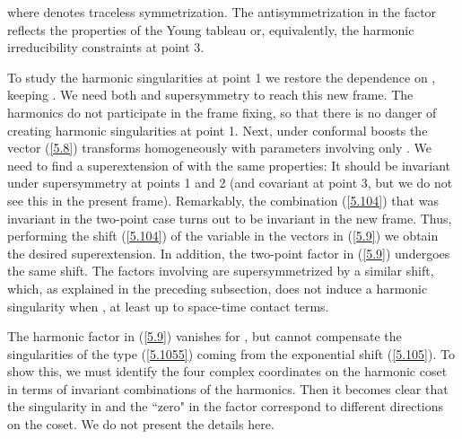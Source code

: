 \documentclass[a4paper,11pt]{article}
\begin{document}
where \coordHE{} denotes traceless symmetrization. The \coordHE{}
antisymmetrization in the factor \coordHE{} reflects the properties of
the \coordHE{} Young tableau \coordHE{} or, equivalently, the harmonic
irreducibility constraints at point 3.

To study the harmonic singularities at point 1 we restore the
dependence on \myHighlight{$\theta$}\coordHE{}, keeping \coordHE{}. We need
both \coordHE{} and \coordHE{} supersymmetry to reach this new frame. The
harmonics \coordHE{} do not participate in the frame fixing, so that
there is no danger of creating harmonic singularities at point 1.
Next, under conformal boosts the vector \coordHE{} (\ref{5.8})
transforms homogeneously with parameters involving only \coordHE{}. We
need to find a superextension of \coordHE{} with the same properties:
It should be invariant under \coordHE{} supersymmetry at points 1 and 2
(and covariant at point 3, but we do not see this in the present
frame). Remarkably, the combination (\ref{5.104}) that was \coordHE{}
invariant in the two-point case turns out to be \coordHE{} invariant in
the new frame. Thus, performing the shift (\ref{5.104}) of the
variable \coordHE{} in the vectors \coordHE{} in (\ref{5.9}) we obtain the
desired superextension. In addition, the two-point factor \coordHE{} in (\ref{5.9}) undergoes the same shift. The
factors involving \coordHE{} are supersymmetrized by a similar
shift, which, as explained in the preceding subsection, does not
induce a harmonic singularity when \coordHE{}, at least up
to space-time contact terms.

The harmonic factor \coordHE{} in (\ref{5.9}) vanishes for \coordHE{}, but cannot compensate the singularities of the type \coordHE{} (\ref{5.1055})
coming from the exponential shift (\ref{5.105}). To show this, we must
identify the four complex coordinates on the harmonic coset
\coordHE{} in terms of \coordHE{}
invariant combinations of the harmonics. Then it becomes clear that the
singularity in \coordHE{} and the ``zero" in the factor \coordHE{} correspond to
different directions on the coset. We do not present the details here.
\end{document}

